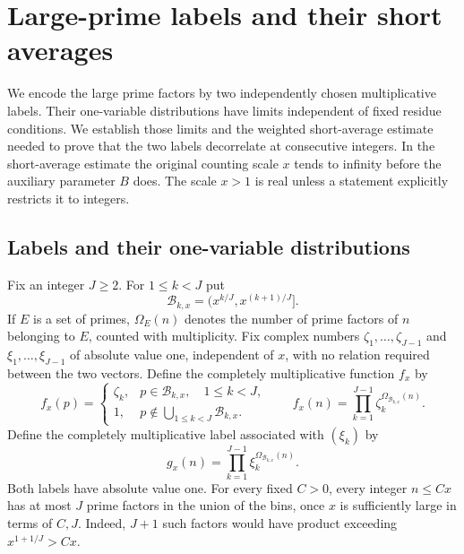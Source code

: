 \section{Large-prime labels and their short averages}\label{sec:labels}

We encode the large prime factors by two independently chosen multiplicative
labels.  Their one-variable distributions have limits independent of fixed
residue conditions.  We establish those limits and the weighted short-average
estimate needed to prove that the two labels decorrelate at consecutive
integers.  In the short-average estimate the original counting scale $x$ tends to
infinity before the auxiliary parameter $B$ does.
The scale $x>1$ is real unless a statement explicitly restricts it to integers.

\subsection{Labels and their one-variable distributions}

Fix an integer $J\geq2$.  For $1\leq k<J$ put
\begin{equation}\label{eq:labels-bins}
 \mathcal B_{k,x}=(x^{k/J},x^{(k+1)/J}].
\end{equation}
If $E$ is a set of primes, $\Omega_E(n)$ denotes the number of prime factors
of $n$ belonging to $E$, counted with multiplicity.  Fix complex numbers
$\zeta_1,\ldots,\zeta_{J-1}$ and $\xi_1,\ldots,\xi_{J-1}$ of absolute
value one, independent of $x$, with no relation required between the two
vectors.  Define the completely multiplicative function $f_x$ by
\begin{equation}\label{eq:labels-function}
 f_x(p)=
 \begin{cases}
  \zeta_k,&p\in\mathcal B_{k,x},\quad 1\leq k<J,\\
  1,&p\notin\bigcup_{1\leq k<J}\mathcal B_{k,x}.
 \end{cases}
 \qquad
 f_x(n)=\prod_{k=1}^{J-1}\zeta_k^{\Omega_{\mathcal B_{k,x}}(n)}.
\end{equation}
Define the completely multiplicative label associated with $(\xi_k)$ by
\begin{equation}\label{eq:labels-second-function}
 g_x(n)=\prod_{k=1}^{J-1}\xi_k^{\Omega_{\mathcal B_{k,x}}(n)}.
\end{equation}
Both labels have absolute value one.
For every fixed $C>0$, every integer $n\leq Cx$ has at most $J$ prime
factors in the union of the bins, once $x$ is sufficiently large in terms
of $C,J$.  Indeed, $J+1$ such factors would have product exceeding
$x^{1+1/J}>Cx$.

